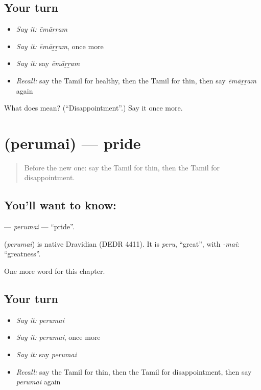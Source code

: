 \subsection*{Your turn}
\begin{itemize}
\raggedright
  \item \emph{Say it:} \emph{ēmāṟṟam}
  \item \emph{Say it:} \emph{ēmāṟṟam}, once more
  \item \emph{Say it:} say \emph{ēmāṟṟam}
  \item \emph{Recall:} say the Tamil for healthy, then the Tamil for thin, then say \emph{ēmāṟṟam} again
\end{itemize}

\begin{tcolorbox}[breakable,colback=teal!4,colframe=teal!35!black,title={Before you move on}]
What does  mean? (\textquotedblleft{}Disappointment\textquotedblright{}.) Say it once more.
\end{tcolorbox}
\section[\texorpdfstring{\ta{பெருமை} (perumai)}{பெருமை (perumai)}]{ (perumai) — pride}

\label{lesson:TA-C239-perumai}



\begin{quote}
Before the new one: say the Tamil for thin, then the Tamil for disappointment.
\end{quote}

\subsection*{You'll want to know: }
\textbf{} — \emph{perumai} — \textquotedblleft{}pride\textquotedblright{}.

\begin{cousinweb}
\textbf{} (\emph{perumai}) is native Dravidian (DEDR 4411). It is \emph{peru}, \textquotedblleft{}great\textquotedblright{}, with \emph{-mai}: \textquotedblleft{}greatness\textquotedblright{}.
\end{cousinweb}

\begin{grammarlens}[title={What you've built}]
One more word for this chapter.
\end{grammarlens}

\subsection*{Your turn}
\begin{itemize}
\raggedright
  \item \emph{Say it:} \emph{perumai}
  \item \emph{Say it:} \emph{perumai}, once more
  \item \emph{Say it:} say \emph{perumai}
  \item \emph{Recall:} say the Tamil for thin, then the Tamil for disappointment, then say \emph{perumai} again
\end{itemize}

